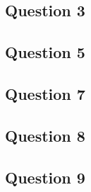 \documentclass{article}
\begin{document}
\subsection{Question 3}

\subsection{Question 5}

\subsection{Question 7}

\subsection{Question 8}

\subsection{Question 9}

\end{document}
